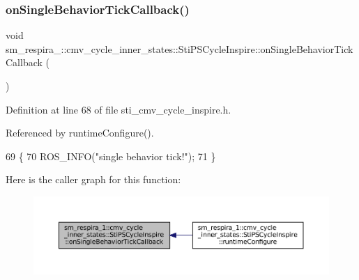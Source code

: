\subsubsection{\texorpdfstring{on\+Single\+Behavior\+Tick\+Callback()}{onSingleBehaviorTickCallback()}}
{\footnotesize\ttfamily void sm\+\_\+respira\+\_\+::cmv\+\_\+cycle\+\_\+inner\+\_\+states\+::\+Sti\+P\+S\+Cycle\+Inspire\+::on\+Single\+Behavior\+Tick\+Callback (\begin{DoxyParamCaption}{ }\end{DoxyParamCaption})\hspace{0.3cm}{\ttfamily [inline]}}



Definition at line 68 of file sti\+\_\+cmv\+\_\+cycle\+\_\+inspire.\+h.



Referenced by runtime\+Configure().


\begin{DoxyCode}
69   \{
70     ROS\_INFO(\textcolor{stringliteral}{"single behavior tick!"});
71   \}
\end{DoxyCode}
Here is the caller graph for this function\+:
\nopagebreak
\begin{figure}[H]
\begin{center}
\leavevmode
\includegraphics[width=350pt]{structsm__respira__1_1_1cmv__cycle__inner__states_1_1StiPSCycleInspire_a7fca128bf0d16cc63e801542a55fd682_icgraph}
\end{center}
\end{figure}
\mbox{\label{structsm__respira__1_1_1cmv__cycle__inner__states_1_1StiPSCycleInspire_ae80efcc3db4156c258e3b6cb08e9e1bb}} 
